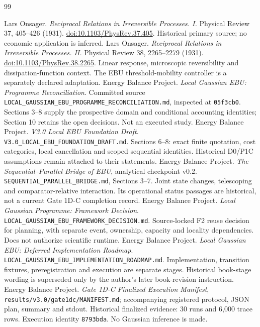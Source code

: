\renewcommand{\bibname}{Sources and authority map}
\begin{thebibliography}{99}
\raggedright
{} Lars Onsager. \emph{Reciprocal Relations in Irreversible Processes. I.} Physical Review 37, 405--426 (1931). \href{https://doi.org/10.1103/PhysRev.37.405}{doi:10.1103/PhysRev.37.405}. Historical primary source; no economic application is inferred.
 Lars Onsager. \emph{Reciprocal Relations in Irreversible Processes. II.} Physical Review 38, 2265--2279 (1931). \href{https://doi.org/10.1103/PhysRev.38.2265}{doi:10.1103/PhysRev.38.2265}. Linear response, microscopic reversibility and dissipation-function context. The EBU threshold-mobility controller is a separately declared adaptation.
 Energy Balance Project. \emph{Local Gaussian EBU: Programme Reconciliation}. Committed source \texttt{LOCAL\_GAUSSIAN\_EBU\_PROGRAMME\_RECONCILIATION.md}, inspected at \texttt{05f3cb0}. Sections 3--8 supply the prospective domain and conditional accounting identities; Section 10 retains the open decisions. Not an executed study.
 Energy Balance Project. \emph{V3.0 Local EBU Foundation Draft}. \texttt{V3.0\_LOCAL\_EBU\_FOUNDATION\_DRAFT.md}. Sections 6--8: exact finite quotation, cost categories, local cancellation and scoped sequential identities. Historical D0/P1C assumptions remain attached to their statements.
 Energy Balance Project. \emph{The Sequential--Parallel Bridge of EBU}, analytical checkpoint v0.2. \texttt{SEQUENTIAL\_PARALLEL\_BRIDGE.md}, Sections 3--7. Joint state changes, telescoping and comparator-relative interaction. Its operational status passages are historical, not a current Gate 1D-C completion record.
 Energy Balance Project. \emph{Local Gaussian Programme: Framework Decision}. \texttt{LOCAL\_GAUSSIAN\_EBU\_FRAMEWORK\_DECISION.md}. Source-locked F2 reuse decision for planning, with separate event, ownership, capacity and locality dependencies. Does not authorize scientific runtime.
 Energy Balance Project. \emph{Local Gaussian EBU: Deferred Implementation Roadmap}. \texttt{LOCAL\_GAUSSIAN\_EBU\_IMPLEMENTATION\_ROADMAP.md}. Implementation, transition fixtures, preregistration and execution are separate stages. Historical book-stage wording is superseded only by the author's later book-revision instruction.
 Energy Balance Project. \emph{Gate 1D-C Finalized Execution Manifest}, \texttt{results/v3.0/gate1dc/MANIFEST.md}; accompanying registered protocol, JSON plan, summary and stdout. Historical finalized evidence: 30 runs and 6,000 trace rows. Execution identity \texttt{8793bda}. No Gaussian inference is made.

\end{thebibliography}

